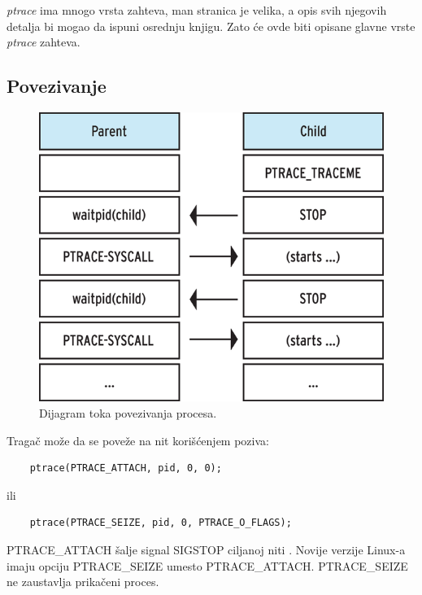 \documentclass[a4paper]{article}
\begin{document}
\emph{ptrace} ima mnogo vrsta zahteva, man stranica je velika, a opis svih njegovih detalja bi mogao da ispuni osrednju knjigu.
Zato će ovde biti opisane glavne vrste \emph{ptrace} zahteva. 

\subsection{Povezivanje}	

\label{sec:pov}
\begin{figure}[h!]
    \begin{center}
    \includegraphics[scale=1.1]{img/diag.png}
    \end{center}
    \caption{Dijagram toka povezivanja procesa.}
    \label{fig:diag}
\end{figure}

Tragač može da se poveže na nit korišćenjem poziva:

\begin{verbatim}
    ptrace(PTRACE_ATTACH, pid, 0, 0);
\end{verbatim}
ili
\begin{verbatim}
    ptrace(PTRACE_SEIZE, pid, 0, PTRACE_O_FLAGS);
\end{verbatim}

PTRACE\_ATTACH šalje signal SIGSTOP ciljanoj niti \cite{man}. 
Novije verzije Linux-a imaju opciju PTRACE\_SEIZE umesto 
PTRACE\_ATTACH. PTRACE\_SEIZE ne zaustavlja prikačeni proces.
\end{document}
